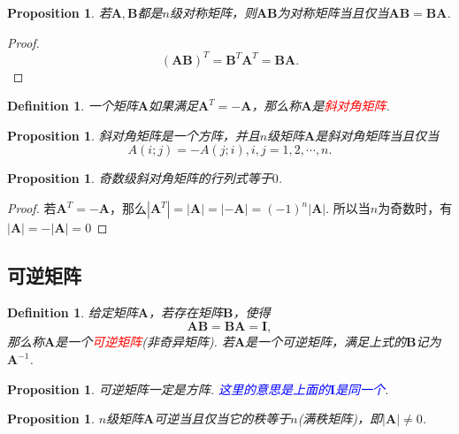 \documentclass{article}
\newtheorem{proposition}[theorem]{Proposition}
\newtheorem{definition}[theorem]{Definition}
\newcommand{\mbf}[1]{\bm{#1}}
\newcommand{\redt}[1]{\textcolor{red}{#1}}
\newcommand{\bluet}[1]{\textcolor{blue}{#1}}
\begin{document}
\begin{proposition}
\rm 若$\mbf{A},\mbf{B}$都是$n$级对称矩阵，则$\mbf{A}\mbf{B}$为对称矩阵当且仅当$\mbf{A}\mbf{B} = \mbf{B}\mbf{A}$.
\end{proposition}

\begin{proof}
$$
(\mbf{A}\mbf{B})^T = \mbf{B}^T\mbf{A}^T = \mbf{B}\mbf{A}.
$$
\end{proof}

\begin{definition}
\rm 一个矩阵$\mbf{A}$如果满足$\mbf{A}^T = -\mbf{A}$，那么称$\mbf{A}$是\redt{斜对角矩阵}.
\end{definition}

\begin{proposition}
\rm 斜对角矩阵是一个方阵，并且$n$级矩阵$\mbf{A}$是斜对角矩阵当且仅当
$$
A(i;j) = -A(j;i), i,j = 1,2,\cdots,n.
$$
\end{proposition}

\begin{proposition}
\rm 奇数级斜对角矩阵的行列式等于$0$.
\end{proposition}

\begin{proof}
若$\mbf{A}^T = - \mbf{A}$，那么$|\mbf{A}^T| = |\mbf{A}| = |-\mbf{A}| = (-1)^n |\mbf{A}|$. 所以当$n$为奇数时，有$|\mbf{A}| = -|\mbf{A}| = 0$
\end{proof}

\subsection{可逆矩阵}

\begin{definition}
\rm 给定矩阵$\mbf{A}$，若存在矩阵$\mbf{B}$，使得
$$
\mbf{A}\mbf{B} = \mbf{B}\mbf{A} = \mbf{I},
$$
那么称$\mbf{A}$是一个\redt{可逆矩阵}(非奇异矩阵). 若$\mbf{A}$是一个可逆矩阵，满足上式的$\mbf{B}$记为$\mbf{A}^{-1}$.
\end{definition}

\begin{proposition}
\rm 可逆矩阵一定是方阵. \bluet{这里的意思是上面的$\mbf{I}$是同一个}. 
\end{proposition}

\begin{proposition}\label{invertible: cond}
\rm $n$级矩阵$\mbf{A}$可逆当且仅当它的秩等于$n$(满秩矩阵)，即$|\mbf{A}| \neq 0$.
\end{proposition}
\end{document}
